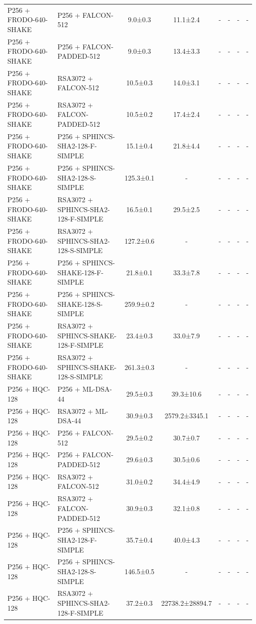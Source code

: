 \documentclass[10pt]{article}
\begin{document}
\begin{tabular}{@{}l l c c c c c c@{}}
P256 + FRODO-640-SHAKE & P256 + FALCON-512 & 9.0±0.3 & 11.1±2.4 & - & - & - & - \\
P256 + FRODO-640-SHAKE & P256 + FALCON-PADDED-512 & 9.0±0.3 & 13.4±3.3 & - & - & - & - \\
P256 + FRODO-640-SHAKE & RSA3072 + FALCON-512 & 10.5±0.3 & 14.0±3.1 & - & - & - & - \\
P256 + FRODO-640-SHAKE & RSA3072 + FALCON-PADDED-512 & 10.5±0.2 & 17.4±2.4 & - & - & - & - \\
P256 + FRODO-640-SHAKE & P256 + SPHINCS-SHA2-128-F-SIMPLE & 15.1±0.4 & 21.8±4.4 & - & - & - & - \\
P256 + FRODO-640-SHAKE & P256 + SPHINCS-SHA2-128-S-SIMPLE & 125.3±0.1 & - & - & - & - & - \\
P256 + FRODO-640-SHAKE & RSA3072 + SPHINCS-SHA2-128-F-SIMPLE & 16.5±0.1 & 29.5±2.5 & - & - & - & - \\
P256 + FRODO-640-SHAKE & RSA3072 + SPHINCS-SHA2-128-S-SIMPLE & 127.2±0.6 & - & - & - & - & - \\
P256 + FRODO-640-SHAKE & P256 + SPHINCS-SHAKE-128-F-SIMPLE & 21.8±0.1 & 33.3±7.8 & - & - & - & - \\
P256 + FRODO-640-SHAKE & P256 + SPHINCS-SHAKE-128-S-SIMPLE & 259.9±0.2 & - & - & - & - & - \\
P256 + FRODO-640-SHAKE & RSA3072 + SPHINCS-SHAKE-128-F-SIMPLE & 23.4±0.3 & 33.0±7.9 & - & - & - & - \\
P256 + FRODO-640-SHAKE & RSA3072 + SPHINCS-SHAKE-128-S-SIMPLE & 261.3±0.3 & - & - & - & - & - \\
P256 + HQC-128 & P256 + ML-DSA-44 & 29.5±0.3 & 39.3±10.6 & - & - & - & - \\
P256 + HQC-128 & RSA3072 + ML-DSA-44 & 30.9±0.3 & 2579.2±3345.1 & - & - & - & - \\
P256 + HQC-128 & P256 + FALCON-512 & 29.5±0.2 & 30.7±0.7 & - & - & - & - \\
P256 + HQC-128 & P256 + FALCON-PADDED-512 & 29.6±0.3 & 30.5±0.6 & - & - & - & - \\
P256 + HQC-128 & RSA3072 + FALCON-512 & 31.0±0.2 & 34.4±4.9 & - & - & - & - \\
P256 + HQC-128 & RSA3072 + FALCON-PADDED-512 & 30.9±0.3 & 32.1±0.8 & - & - & - & - \\
P256 + HQC-128 & P256 + SPHINCS-SHA2-128-F-SIMPLE & 35.7±0.4 & 40.0±4.3 & - & - & - & - \\
P256 + HQC-128 & P256 + SPHINCS-SHA2-128-S-SIMPLE & 146.5±0.5 & - & - & - & - & - \\
P256 + HQC-128 & RSA3072 + SPHINCS-SHA2-128-F-SIMPLE & 37.2±0.3 & 22738.2±28894.7 & - & - & - & - \\

\end{tabular}
\end{document}
